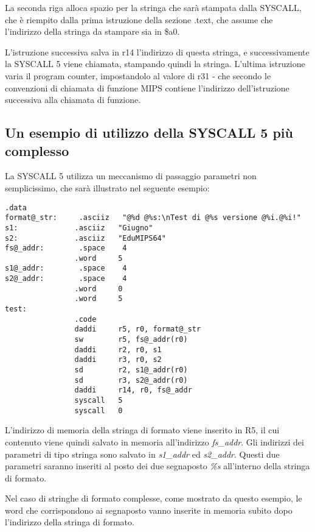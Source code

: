 \documentclass[letterpaper,10pt,english]{sphinxmanual}
\begin{document}
La seconda riga alloca spazio per la stringa che sarà stampata dalla SYSCALL,
che è riempito dalla prima istruzione della sezione .text, che assume che
l'indirizzo della stringa da stampare sia in \$a0.

L'istruzione successiva salva in r14 l'indirizzo di questa stringa, e
successivamente la SYSCALL 5 viene chiamata, stampando quindi la stringa.
L'ultima istruzione varia il program counter, impostandolo al valore di r31 -
che secondo le convenzioni di chiamata di funzione MIPS contiene l'indirizzo
dell'istruzione successiva alla chiamata di funzione.


\subsection{Un esempio di utilizzo della SYSCALL 5 più complesso}
\label{examples:un-esempio-di-utilizzo-della-syscall-5-piu-complesso}
La SYSCALL 5 utilizza un meccanismo di passaggio parametri non semplicissimo,
che sarà illustrato nel seguente esempio:

\begin{Verbatim}[commandchars=@\[\]]
                .data
format@_str:     .asciiz   "@%d @%s:\nTest di @%s versione @%i.@%i!"
s1:             .asciiz   "Giugno"
s2:             .asciiz   "EduMIPS64"
fs@_addr:        .space    4
                .word     5
s1@_addr:        .space    4
s2@_addr:        .space    4
                .word     0
                .word     5
test:
                .code
                daddi     r5, r0, format@_str
                sw        r5, fs@_addr(r0)
                daddi     r2, r0, s1
                daddi     r3, r0, s2
                sd        r2, s1@_addr(r0)
                sd        r3, s2@_addr(r0)
                daddi     r14, r0, fs@_addr
                syscall   5
                syscall   0
\end{Verbatim}

L'indirizzo di memoria della stringa di formato viene inserito in R5, il cui
contenuto viene quindi salvato in memoria all'indirizzo \emph{fs\_addr}. Gli
indirizzi dei parametri di tipo stringa sono salvato in \emph{s1\_addr} ed
\emph{s2\_addr}. Questi due parametri saranno inseriti al posto dei due segnaposto
\emph{\%s} all'interno della stringa di formato.

Nel caso di stringhe di formato complesse, come mostrato da questo esempio, le
word che corrispondono ai segnaposto vanno inserite in memoria subito dopo
l'indirizzo della stringa di formato.



\renewcommand{\indexname}{Index}
\printindex
\end{document}
